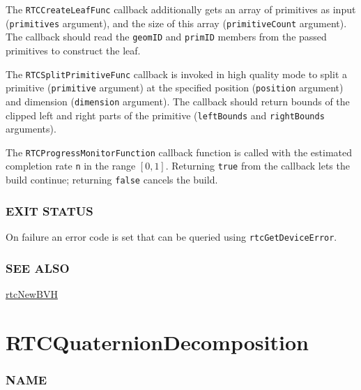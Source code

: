 The \texttt{RTCCreateLeafFunc} callback additionally gets an array of
primitives as input (\texttt{primitives} argument), and the size of this
array (\texttt{primitiveCount} argument). The callback should read the
\texttt{geomID} and \texttt{primID} members from the passed primitives
to construct the leaf.

The \texttt{RTCSplitPrimitiveFunc} callback is invoked in high quality
mode to split a primitive (\texttt{primitive} argument) at the specified
position (\texttt{position} argument) and dimension (\texttt{dimension}
argument). The callback should return bounds of the clipped left and
right parts of the primitive (\texttt{leftBounds} and
\texttt{rightBounds} arguments).

The \texttt{RTCProgressMonitorFunction} callback function is called with
the estimated completion rate \texttt{n} in the range \([0,1]\).
Returning \texttt{true} from the callback lets the build continue;
returning \texttt{false} cancels the build.

\subsubsection{EXIT STATUS}\label{exit-status}

On failure an error code is set that can be queried using
\texttt{rtcGetDeviceError}.

\subsubsection{SEE ALSO}\label{see-also}

\hyperref[rtcnewbvh]{rtcNewBVH}

\pagebreak

\section{RTCQuaternionDecomposition}\label{rtcquaterniondecomposition}

\subsubsection{NAME}\label{name}

\begin{Shaded}
\begin{Highlighting}[]
\OperatorTok{{-}}
\end{Highlighting}
\end{Shaded}

